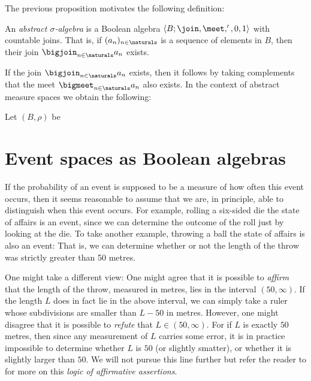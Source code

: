 \documentclass[article, a4paper, 11pt, oneside]{memoir}
\numberwithin{equation}{chapter}
\begin{document}
The previous proposition motivates the following definition:

\begin{definition}
    An \emph{abstract $\sigma$-algebra} is a Boolean algebra $\langle B; \join, \meet, ', 0, 1 \rangle$ with countable joins. That is, if $(a_n)_{n\in\naturals}$ is a sequence of elements in $B$, then their join $\bigjoin_{n\in\naturals} a_n$ exists.
\end{definition}
%
If the join $\bigjoin_{n\in\naturals} a_n$ exists, then it follows by taking complements that the meet $\bigmeet_{n\in\naturals} a_n$ also exists. In the context of abstract measure spaces we obtain the following:

\begin{definition}
    Let $(B,\rho)$ be 
\end{definition}


\chapter{Event spaces as Boolean algebras}

If the probability of an event is supposed to be a measure of how often this event occurs, then it seems reasonable to assume that we are, in principle, able to distinguish when this event occurs. For example, rolling a six-sided die the state of affairs  is an event, since we can determine the outcome of the roll just by looking at the die. To take another example, throwing a ball the state of affairs  is also an event: That is, we can determine whether or not the length of the throw was strictly greater than 50 metres.

One might take a different view: One might agree that it is possible to \emph{affirm} that the length of the throw, measured in metres, lies in the interval $(50,\infty)$. If the length $L$ does in fact lie in the above interval, we can simply take a ruler whose subdivisions are smaller than $L - 50$ in metres. However, one might disagree that it is possible to \emph{refute} that $L \in (50, \infty)$. For if $L$ is exactly $50$ metres, then since any measurement of $L$ carries some error, it is in practice impossible to determine whether $L$ is $50$ (or slightly smatter), or whether it is slightly larger than $50$. We will not pursue this line further but refer the reader to \textcite{vickers1989} for more on this \emph{logic of affirmative assertions}.
\end{document}
